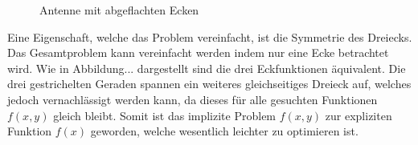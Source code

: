 \begin{figure}[htbp]
\begin{minipage}[t]{0.45\textwidth}
		\caption{Antenne mit abgeflachten Ecken}
		\label{antennen:tikabgeflacht_kleiner}
	\end{minipage}
\end{figure}
\FloatBarrier
Eine Eigenschaft, welche das Problem vereinfacht, ist die Symmetrie des Dreiecks. 
Das Gesamtproblem kann vereinfacht werden indem nur eine Ecke betrachtet wird. 
Wie in Abbildung... dargestellt sind die drei Eckfunktionen äquivalent. Die drei 
gestrichelten Geraden spannen ein weiteres gleichseitiges Dreieck auf, welches 
jedoch vernachlässigt werden kann, da dieses für alle gesuchten Funktionen $f(x,y)$ 
gleich bleibt. Somit ist das implizite Problem $f(x,y)$ zur expliziten Funktion $f(x)$ 
geworden, welche wesentlich leichter zu optimieren ist.
